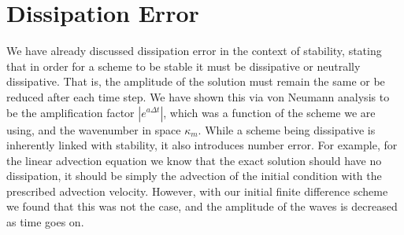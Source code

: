\section{Dissipation Error}
We have already discussed dissipation error in the context of stability, stating that in order for a scheme to be stable it must be dissipative or neutrally dissipative. That is, the amplitude of the solution must remain the same or be reduced after each time step. We have shown this via von Neumann analysis to be the amplification factor $|e^{a\Delta t}|$, which was a function of the scheme we are using, and the wavenumber in space $\kappa_m$. While a scheme being dissipative is inherently linked with stability, it also introduces number error. For example, for the linear advection equation we know that the exact solution should have no dissipation, it should be simply the advection of the initial condition with the prescribed advection velocity. However, with our initial finite difference scheme we found that this was not the case, and the amplitude of the waves is decreased as time goes on.

